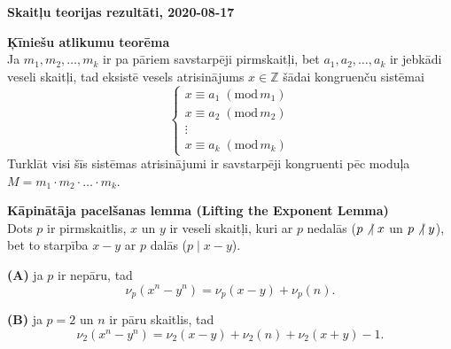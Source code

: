 \documentclass[11pt]{article}
\begin{document}
\thispagestyle{empty}

{\Large \bf Skaitļu teorijas rezultāti, 2020-08-17}


\vspace{6ex}
{\bf Ķīniešu atlikumu teorēma}\\
Ja $m_1,m_2,\ldots,m_k$ ir pa pāriem savstarpēji pirmskaitļi, 
bet $a_1,a_2,\ldots,a_k$ ir jebkādi veseli skaitļi, tad eksistē
vesels atrisinājums $x \in \mathbb{Z}$ šādai kongruenču 
sistēmai 
$$\left\{ \begin{array}{l}
x \equiv a_1\;(\text{mod}\,m_1)\\
x \equiv a_2\;(\text{mod}\,m_2)\\
\vdots\\
x \equiv a_k\;(\text{mod}\,m_k)
\end{array} \right.$$
Turklāt visi šīs sistēmas atrisinājumi ir savstarpēji kongruenti 
pēc moduļa $M = m_1\cdot m_2 \cdot \ldots \cdot m_k$.


\vspace{6ex}
{\bf Kāpinātāja pacelšanas lemma (Lifting the Exponent Lemma)}\\

Dots $p$ ir pirmskaitlis, $x$ un $y$ ir veseli skaitļi, 
kuri ar $p$ nedalās ($p \not\,\,\mid x$ un $p \not\,\,\mid y$), 
bet to starpība $x-y$ ar $p$ dalās ($p \mid x-y$).

{\bf (A)} ja $p$ ir nepāru, tad 
$$\nu_p(x^n - y^n) = \nu_p(x-y) + \nu_p(n).$$

{\bf (B)} ja $p=2$ un $n$ ir pāru skaitlis, tad 
$$\nu_2(x^n - y^n) = \nu_2(x-y) + \nu_2(n) + \nu_2(x+y) - 1.$$
\end{document}
